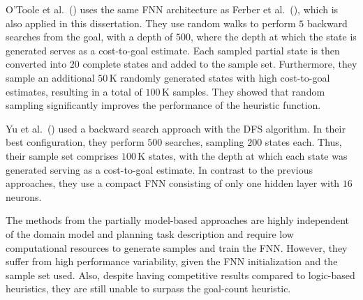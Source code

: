O'Toole et al.~(\citeyear{OToole/2022}) uses the same FNN architecture as Ferber et al.~(\citeyear{Ferber.etal/2022}), which is also applied in this dissertation. They use random walks to perform $5$ backward searches from the goal, with a depth of $500$, where the depth at which the state is generated serves as a cost-to-goal estimate. Each sampled partial state is then converted into $20$ complete states and added to the sample set. Furthermore, they sample an additional $50$\,K randomly generated states with high cost-to-goal estimates, resulting in a total of $100$\,K samples. They showed that random sampling significantly improves the performance of the heuristic function.

Yu et al.~(\citeyear{Yu.etal/2020}) used a backward search approach with the DFS algorithm. In their best configuration, they perform $500$ searches, sampling $200$ states each. Thus, their sample set comprises $100$\,K states, with the depth at which each state was generated serving as a cost-to-goal estimate. In contrast to the previous approaches, they use a compact FNN consisting of only one hidden layer with $16$ neurons.

The methods from the partially model-based approaches are highly independent of the domain model and planning task description and require low computational resources to generate samples and train the FNN. However, they suffer from high performance variability, given the FNN initialization and the sample set used. Also, despite having competitive results compared to logic-based heuristics, they are still unable to surpass the goal-count heuristic.
